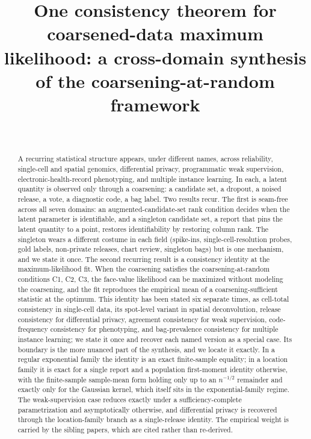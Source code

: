\documentclass[sts]{imsart}
\theoremstyle{plain}
\theoremstyle{definition}
\newcommand{\1}{\mathbf{1}}
\begin{document}
\begin{frontmatter}

\title{One consistency theorem for coarsened-data maximum likelihood:
       a cross-domain synthesis of the coarsening-at-random framework}

\begin{aug}
\author[A]{~}

\address[A]{Department of Computer Science,
Southern Illinois University Edwardsville,
Edwardsville, Illinois, USA.}
\end{aug}

\begin{abstract}
A recurring statistical structure appears, under different names,
across reliability, single-cell and spatial genomics, differential
privacy, programmatic weak supervision, electronic-health-record
phenotyping, and multiple instance learning. In each, a latent quantity
is observed only through a
coarsening: a candidate set, a dropout, a noised release, a vote, a
diagnostic code, a bag label. Two results recur. The first is seam-free
across all seven domains: an augmented-candidate-set rank condition
decides when the
latent parameter is identifiable, and a singleton candidate set, a
report that pins the latent quantity to a point, restores
identifiability by restoring column rank. The singleton wears a
different costume in each field (spike-ins, single-cell-resolution
probes, gold labels, non-private releases, chart review, singleton bags)
but is one mechanism, and we state it once. The second recurring result is a
consistency identity at the maximum-likelihood fit. When the coarsening
satisfies the coarsening-at-random conditions C1, C2, C3, the
face-value likelihood can be maximized without modeling the coarsening,
and the fit reproduces the empirical mean of a coarsening-sufficient
statistic at the optimum. This identity has been stated six separate
times, as cell-total consistency in single-cell data, its spot-level
variant in spatial deconvolution, release consistency for differential
privacy, agreement consistency for weak supervision, code-frequency
consistency for phenotyping, and bag-prevalence consistency for multiple
instance learning; we state it once and recover each named
version as a special case. Its boundary is the more nuanced part of the
synthesis, and we locate it exactly. In a regular exponential family
the identity is an exact finite-sample equality; in a location family
it is exact for a single report and a population first-moment identity
otherwise, with the finite-sample sample-mean form holding only up to
an $n^{-1/2}$ remainder and exactly only for the Gaussian kernel, which
itself sits in the exponential-family regime. The weak-supervision case
reduces exactly under a sufficiency-complete parametrization and
asymptotically otherwise, and differential privacy is recovered through
the location-family branch as a single-release identity. The empirical
weight is carried by the sibling papers, which are cited rather than
re-derived.
\end{abstract}


\end{frontmatter}
\end{document}
